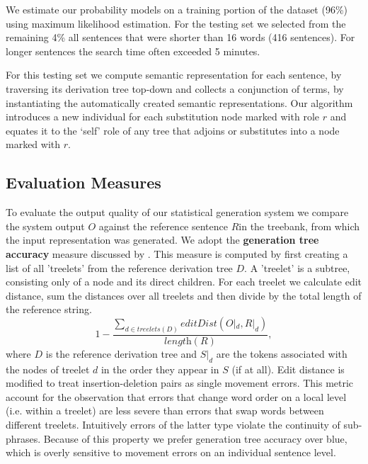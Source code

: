 We estimate our probability models on a training portion of the dataset (96\%) using maximum likelihood estimation.
For the testing set we selected from the remaining 4\% all sentences that were shorter than 16 words (416 sentences). For longer sentences the search time often exceeded 5 minutes. 

For this testing set we compute semantic representation for each sentence, by traversing its derivation tree top-down and collects a conjunction of terms, by instantiating the automatically created semantic representations. Our algorithm introduces a new individual for each substitution node marked with role $r$ and equates it to the `self' role of any tree that adjoins or substitutes into a node marked with $r$. 

\subsection{Evaluation Measures}
\label{ssec:eval-measures}
To evaluate the output quality of our statistical generation system we compare the system output $O$ against the reference sentence $R$in the treebank, from which the input representation was generated. We adopt the {\bf generation tree accuracy} measure discussed by \cite{bangalorerambowwhittaker2001}.
This measure is computed by first creating a list of all 'treelets' from the reference derivation tree $D$. A 'treelet' is a subtree, consisting only of a node and its direct children. For each treelet we calculate edit distance, sum the distances over all treelets and then divide by the total length of the reference string.
$$1 - \frac{\sum\limits_{d \in treelets(D)} editDist(O|_d, R|_d)}{\textit{length}(R)},$$
where $D$ is the reference derivation tree and $S|_d$ are the tokens associated with the nodes of treelet $d$ in the order they appear in $S$ (if at all). 
Edit distance is modified to treat insertion-deletion pairs as single movement errors. 
This metric account for the observation that errors that change word order on a local level (i.e. within a treelet) are less severe than errors that swap words between different treelets. Intuitively errors of the latter type violate the continuity of sub-phrases. Because of this property we prefer generation tree accuracy over {\sc blue}, which is overly sensitive to movement errors on an individual sentence level.


